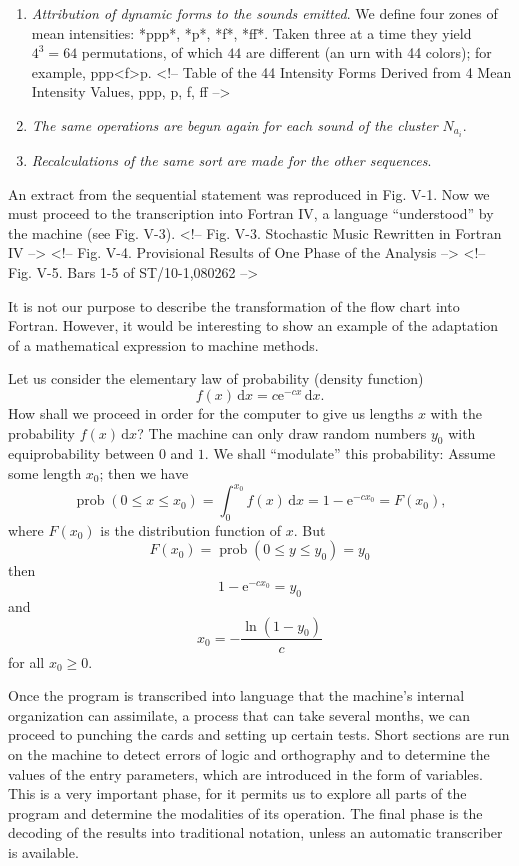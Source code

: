 \documentclass[letterpaper, 11pt]{article}
\begin{document}
\begin{enumerate}
        Finally, the duration \(x\) of the sound will be given by the relation
        \[x = \pm us\sqrt{2} + m.\]

        We do not take into account incompatibilities between instruments, for this would needlessly burden the machine's program and calculation.
    \item 
        \textit{Attribution of dynamic forms to the sounds emitted}.
        We define four zones of mean intensities: *ppp*, *p*, *f*, *ff*.
        Taken three at a time they yield \(4^3 = 64\) permutations, of which \(44\) are different (an urn with 44 colors); for example, ppp<f>p.
   <!-- Table of the 44 Intensity Forms Derived from 4 Mean Intensity Values, ppp, p, f, ff -->
    \item 
        \textit{The same operations are begun again for each sound of the cluster \(N_{a_i}\)}.
    \item
        \textit{Recalculations of the same sort are made for the other sequences}.
\end{enumerate}

An extract from the sequential statement was reproduced in Fig. V-1.
Now we must proceed to the transcription into Fortran IV, a language ``understood'' by the machine (see Fig. V-3).
<!-- Fig. V-3. Stochastic Music Rewritten in Fortran IV -->
<!-- Fig. V-4. Provisional Results of One Phase of the Analysis -->
<!-- Fig. V-5. Bars 1-5 of ST/10-1,080262 -->

It is not our purpose to describe the transformation of the flow chart into Fortran.
However, it would be interesting to show an example of the adaptation of a mathematical expression to machine methods.

Let us consider the elementary law of probability (density function)
\[ f(x) \, \mathrm{d}x = c\mathrm{e}^{-cx} \, \mathrm{d}x.\]
How shall we proceed in order for the computer to give us lengths \(x\) with the probability \(f(x) \, \mathrm{d}x\)?
The machine can only draw random numbers \(y_0\) with equiprobability between \(0\) and \(1\).
We shall ``modulate'' this probability: Assume some length \(x_0\); then we have
\[\operatorname{prob}{(0 \leq x \leq x_0)} = \int_0^{x_0} f(x) \, \mathrm{d}x = 1 - \mathrm{e}^{-cx_0} = F(x_0),\]
where \(F(x_0)\) is the distribution function of \(x\).
But
\[F(x_0) = \operatorname{prob}{(0 \leq y \leq y_0)} = y_0\]
then
\[1 - \mathrm{e}^{-cx_0} = y_0\]
and
\[x_0 = - \frac{\ln{(1 - y_0)}}{c}\]
for all \(x_0 \geq 0\).

Once the program is transcribed into language that the machine's internal organization can assimilate, a process that can take several months, we can proceed to punching the cards and setting up certain tests.
Short sections are run on the machine to detect errors of logic and orthography and to determine the values of the entry parameters, which are introduced in the form of variables.
This is a very important phase, for it permits us to explore all parts of the program and determine the modalities of its operation.
The final phase is the decoding of the results into traditional notation, unless an automatic transcriber is available.
\end{document}
